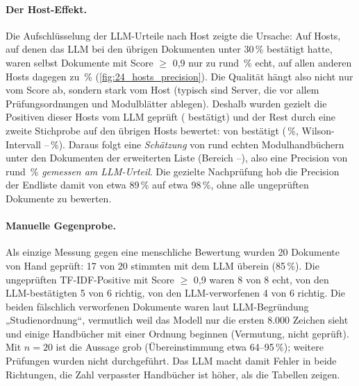 \paragraph{Der Host-Effekt.} Die Aufschlüsselung der LLM-Urteile nach Host zeigte die Ursache: Auf \zSuspectHosts{} Hosts, auf denen das LLM bei den übrigen Dokumenten unter 30\,\% bestätigt hatte, waren selbst Dokumente mit Score $\ge$ 0,9 nur zu rund \zSuspectPct\,\% echt, auf allen anderen Hosts dagegen zu \zNonSuspectPct\,\% (\cref{fig:24_hosts_precision}). Die Qualität hängt also nicht nur vom Score ab, sondern stark vom Host (typisch sind Server, die vor allem Prüfungsordnungen und Modulblätter ablegen). Deshalb wurden gezielt die \zSuspectN{} Positiven dieser Hosts vom LLM geprüft (\zSuspectOK{} bestätigt) und der Rest durch eine zweite Stichprobe auf den übrigen Hosts bewertet: \zNonSuspectOK{} von \zNonSuspectN{} bestätigt (\zNonSuspectPct\,\%, Wilson-Intervall \zNonSuspectLo{}--\zNonSuspectHi{}\,\%). Daraus folgt eine \emph{Schätzung} von rund \zEstTrue{} echten Modulhandbüchern unter den \zFinalListed{} Dokumenten der erweiterten Liste (Bereich \zEstTrueLow{}--\zEstTrueHigh{}), also eine Precision von rund \zPrecisionEnd\,\% \emph{gemessen am LLM-Urteil}. Die gezielte Nachprüfung hob die Precision der Endliste damit von etwa 89\,\% auf etwa 98\,\%, ohne alle ungeprüften Dokumente zu bewerten.


\paragraph{Manuelle Gegenprobe.} Als einzige Messung gegen eine menschliche Bewertung wurden 20 Dokumente von Hand geprüft: 17 von 20 stimmten mit dem LLM überein (85\,\%). Die ungeprüften TF-IDF-Positive mit Score $\ge$ 0,9 waren 8 von 8 echt, von den LLM-bestätigten 5 von 6 richtig, von den LLM-verworfenen 4 von 6 richtig. Die beiden fälschlich verworfenen Dokumente waren laut LLM-Begründung „Studienordnung“, vermutlich weil das Modell nur die ersten 8.000 Zeichen sieht und einige Handbücher mit einer Ordnung beginnen (Vermutung, nicht geprüft). Mit $n=20$ ist die Aussage grob (Übereinstimmung etwa 64--95\,\%); weitere Prüfungen wurden nicht durchgeführt. Das LLM macht damit Fehler in beide Richtungen, die Zahl verpasster Handbücher ist höher, als die Tabellen zeigen.


